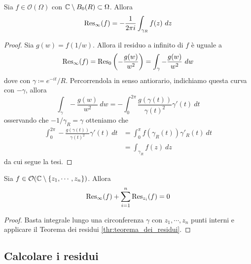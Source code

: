 \begin{lemma}
  Sia $f \in \mathcal{O}(\Omega)$ con $\mathbb{C} \setminus B_0(R) \subset \Omega$.
  Allora 
  \begin{equation*}
    \operatorname{Res}_\infty (f) = -\frac{1}{2\pi i } \int_{\gamma_R} f(z)\ dz
  \end{equation*}
  \label{lem:residuo_a_infinito}
\end{lemma}
\begin{proof}
  Sia $g(w) = f(1/w)$. Allora il residuo a infinito di $f$ è uguale a 
  \begin{equation*}
    \operatorname{Res}_\infty(f) = \operatorname{Res}_0\left(-\frac{g(w)}{w^2}  \right) = \int_{\gamma}
    -\frac{g(w)}{w^2}\ dw
  \end{equation*}
  dove con $\gamma \coloneqq e^{-it}/R$. Percorrendola in senso antiorario,
  indichiamo questa curva con $-\gamma$, allora
  \begin{equation*}
    \int_{\gamma} -\frac{g(w)}{w^2}\ dw  = - \int_{0}^{2\pi}
    \frac{g(\gamma(t))}{\gamma(t)^2} \gamma'(t)\ dt 
  \end{equation*}
  osservando che $-1/\gamma_R = \gamma$ otteniamo che 
  \begin{align*}
     \int_{0}^{2\pi} -\frac{g(\gamma(t))}{\gamma(t)^2} \gamma'(t)\ dt
     & = \int_{0}^{\pi} f(\gamma_R(t)) \gamma'_R(t) \ dt\\
     & = \int_{\gamma_R} f(z)\ dz
  \end{align*}
  da cui segue la tesi.
\end{proof}

\begin{corollary}
  Sia $f \in \mathcal{O}(\mathbb{C} \setminus \left\{ z_1, \cdots, z_n \right\})$. Allora 
    \begin{equation*}
      \operatorname{Res}_\infty(f) + \sum_{i=1}^{n} \operatorname{Res}_{z_i}(f) = 0
    \end{equation*}
\end{corollary}
\begin{proof}
  Basta integrale lungo una circonferenza $\gamma$ con $z_1, \cdots, z_n$ punti
  interni e applicare il Teorema dei residui \ref{thr:teorema_dei_residui}.
\end{proof}


\subsection{\textcolor{AnComp}{\textbf{Calcolare i residui}}}

